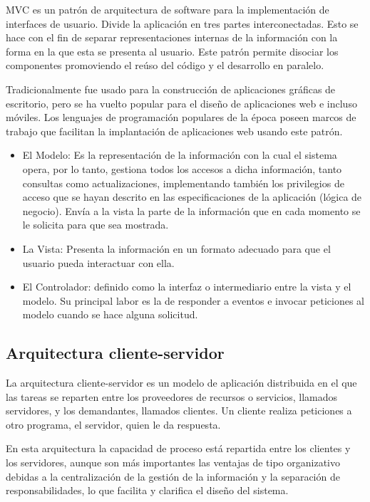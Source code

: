 \gls{MVC} es un patrón de arquitectura de software para la implementación de interfaces de usuario. Divide la aplicación en tres partes interconectadas. Esto se hace con el fin de separar representaciones internas de la información con la forma en la que esta se presenta al usuario. Este patrón permite disociar los componentes promoviendo el reúso del código y el desarrollo en paralelo\cite{bib:mvc}.

Tradicionalmente fue usado para la construcción de aplicaciones gráficas de escritorio, pero se ha vuelto popular para el diseño de aplicaciones web e incluso móviles. Los lenguajes de programación populares de la época poseen marcos de trabajo que facilitan la implantación de aplicaciones web usando este patrón.

\begin{itemize}

\item El Modelo: Es la representación de la información con la cual el sistema opera, por lo tanto, gestiona todos los accesos a dicha información, tanto consultas como actualizaciones, implementando también los privilegios de acceso que se hayan descrito en las especificaciones de la aplicación (lógica de negocio). Envía a la vista la parte de la información que en cada momento se le solicita para que sea mostrada.

\item La Vista: Presenta la información en un formato adecuado para que el usuario pueda interactuar con ella.

\item El Controlador: definido como la interfaz o intermediario entre la vista y el modelo. Su principal labor es la de responder a eventos e invocar peticiones al modelo cuando se hace alguna solicitud. 

\end{itemize}

\subsection{Arquitectura cliente-servidor}

La arquitectura cliente-servidor es un modelo de aplicación distribuida en el que las tareas se reparten entre los proveedores de recursos o servicios, llamados servidores, y los demandantes, llamados clientes. Un cliente realiza peticiones a otro programa, el servidor, quien le da respuesta.

En esta arquitectura la capacidad de proceso está repartida entre los clientes y los servidores, aunque son más importantes las ventajas de tipo organizativo debidas a la centralización de la gestión de la información y la separación de responsabilidades, lo que facilita y clarifica el diseño del sistema.

